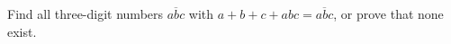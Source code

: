 Find all three-digit numbers $\overline{abc}$ with $a+b+c+abc=\overline{abc}$, or prove that none exist.

